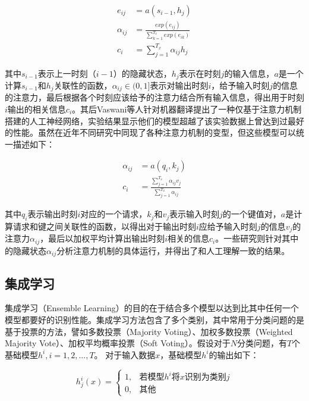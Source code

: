 \begin{align}
  \label{eq:attention}
  e_{ij} &= a(s_{i - 1}, h_j) \\
  \alpha_{ij} &= \frac{exp(e_{ij})}{\sum\limits_{k=1}^{T_x}{exp(e_{ik})}} \\
  c_{i} &= \sum\limits_{j=1}^{T_x}{\alpha_{ij}h_j}
\end{align}

其中$s_{i-1}$表示上一时刻（$i-1$）的隐藏状态，$h_j$表示在时刻$j$的输入信息，$a$是一个计算$s_{i - 1}$和$h_j$关联性的函数，$\alpha_{ij} \in (0, 1]$表示对输出时刻$i$，给予输入时刻$j$的信息的注意力，最后根据各个时刻应该给予的注意力结合所有输入信息，得出用于时刻$i$输出的相关信息$c_{i}$。其后Vaswani等人\cite{vaswani2017attention}针对机器翻译提出了一种仅基于注意力机制搭建的人工神经网络，实验结果显示他们的模型超越了该实验数据上曾达到过最好的性能。虽然在近年不同研究\cite{luong2015effective}\cite{graves2014neural}\cite{xu2015show}中同现了各种注意力机制的变型，但这些模型可以统一描述如下：

\begin{align}
  \alpha_{ij} &= a(q_i, k_j) \\
  c_i &= \frac
    {\sum\limits_{j=1}^{T_x}{\alpha_{ij}v_j}}
    {\sum\limits_{j=1}^{T_x}{\alpha_{ij}}}
\end{align}

其中$q_i$表示输出时刻$i$对应的一个请求，$k_j$和$v_j$表示输入时刻$j$的一个键值对，$a$是计算请求和键之间关联性的函数，以得出对于输出时刻$i$应给予输入时刻$j$的信息$v_j$的注意力$\alpha_{ij}$，最后以加权平均计算出输出时刻$i$相关的信息$c_i$。一些研究\cite{wang2016attention}\cite{pontiki2014semeval}则针对其中的隐藏状态$\alpha_{ij}$分析注意力机制的具体运行，并得出了和人工理解一致的结果。

\subsection{集成学习}
\label{ssec:intro_ensemble_learning}

集成学习（Ensemble Learning）的目的在于结合多个模型以达到比其中任何一个模型都要好的识别性能。集成学习方法包含了多个类别，其中常用于分类问题的是基于投票的方法，譬如多数投票（Majority Voting）、加权多数投票（Weighted Majority Vote）、加权平均概率投票（Soft Voting）。假设对于$N$分类问题，有$T$个基础模型$h^i, i = 1,2,...,T$。
对于输入数据$x$，基础模型$h^i$的输出如下：

\begin{equation}
  h^i_j(x) = 
  \begin{cases}
  1, & \mbox{若模型}h^i\mbox{将}x\mbox{识别为类别}j  \\
  0, & \mbox{其他}
  \end{cases}
\end{equation}


